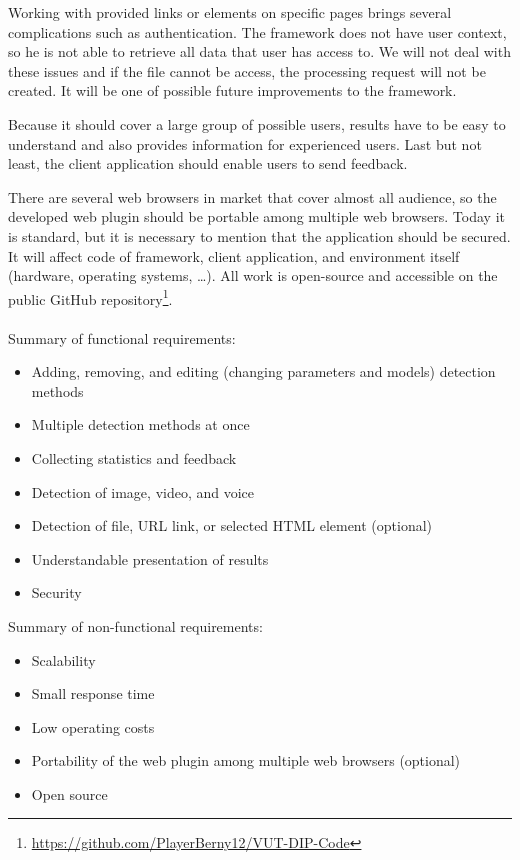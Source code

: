 Working with provided links or elements on specific pages brings several complications such as authentication. The framework does not have user context, so he is not able to retrieve all data that user has access to. We will not deal with these issues and if the file cannot be access, the processing request will not be created. It will be one of possible future improvements to the framework.

Because it should cover a large group of possible users, results have to be easy to understand and also provides information for experienced users. Last but not least, the client application should enable users to send feedback.

There are several web browsers in market that cover almost all audience, so the developed web plugin should be portable among multiple web browsers. Today it is standard, but it is necessary to mention that the application should be secured. It will affect code of framework, client application, and environment itself (hardware, operating systems, …). All work is open-source and accessible on the public GitHub repository\footnote{\url{https://github.com/PlayerBerny12/VUT-DIP-Code}}.
\\\\
\noindent Summary of functional requirements:
\begin{itemize}
    \item Adding, removing, and editing (changing parameters and models) detection methods
    \item Multiple detection methods at once
    \item Collecting statistics and feedback
    \item Detection of image, video, and voice
    \item Detection of file, URL link, or selected HTML element (optional)
    \item Understandable presentation of results
    \item Security
\end{itemize}

\noindent Summary of non-functional requirements:
\begin{itemize}
    \item Scalability
    \item Small response time
    \item Low operating costs
    \item Portability of the web plugin among multiple web browsers (optional)
    \item Open source
\end{itemize}

